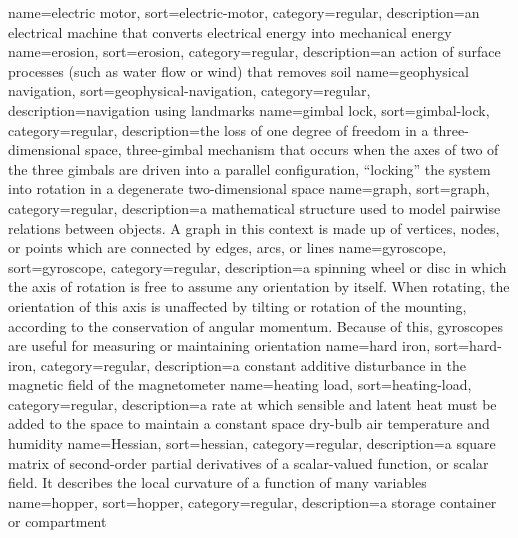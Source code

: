 %
{%
  name={electric motor},%
  sort={electric-motor},%
  category={regular},%
  description={an electrical machine that converts electrical energy into mechanical energy}%
}
%
{%
  name={erosion},%
  sort={erosion},%
  category={regular},%
  description={an action of surface processes (such as water flow or wind) that removes soil}%
}
%
{%
  name={geophysical navigation},%
  sort={geophysical-navigation},%
  category={regular},%
  description={navigation using landmarks}%
}
%
{%
  name={gimbal lock},%
  sort={gimbal-lock},%
  category={regular},%
  description={the loss of one degree of freedom in a three-dimensional space, three-gimbal mechanism that occurs when the axes of two of the three gimbals are driven into a parallel configuration, ``locking'' the system into rotation in a degenerate two-dimensional space}%
}
%
{%
  name={graph},%
  sort={graph},%
  category={regular},%
  description={a mathematical structure used to model pairwise relations between objects. A graph in this context is made up of vertices, nodes, or points which are connected by edges, arcs, or lines}%
}
%
{%
  name={gyroscope},%
  sort={gyroscope},%
  category={regular},%
  description={a spinning wheel or disc in which the axis of rotation is free to assume any orientation by itself. When rotating, the orientation of this axis is unaffected by tilting or rotation of the mounting, according to the conservation of angular momentum. Because of this, gyroscopes are useful for measuring or maintaining orientation}%
}
%
{%
  name={hard iron},%
  sort={hard-iron},%
  category={regular},%
  description={a constant additive disturbance in the magnetic field of the magnetometer}%
}
%
{%
  name={heating load},%
  sort={heating-load},%
  category={regular},%
  description={a rate at which sensible and latent heat must be added to the space to maintain a constant space dry-bulb air temperature and humidity}%
}
%
{%
  name={Hessian},%
  sort={hessian},%
  category={regular},%
  description={a square matrix of second-order partial derivatives of a scalar-valued function, or scalar field. It describes the local curvature of a function of many variables}%
}
%
{%
  name={hopper},%
  sort={hopper},%
  category={regular},%
  description={a storage container or compartment}%
}
